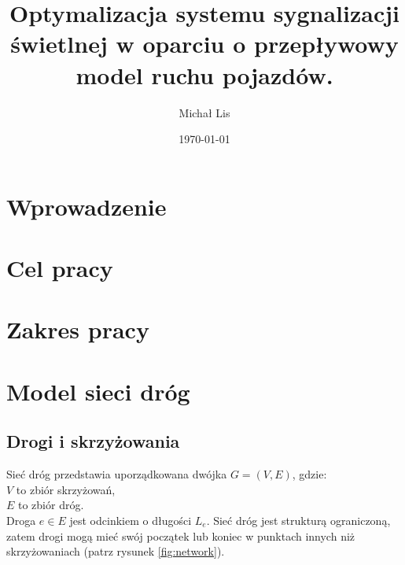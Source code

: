 \documentclass[12pt]{book}
\begin{document}
\title{Optymalizacja  systemu sygnalizacji świetlnej w 
oparciu o przepływowy model ruchu pojazdów.}
\author{Michał Lis}
\date{\today}
\maketitle
\chapter{Wprowadzenie}
\chapter{Cel pracy}
\chapter{Zakres pracy}
   
\chapter{Model sieci dróg}
\section{Drogi i skrzyżowania}
Sieć dróg przedstawia uporządkowana dwójka $G=(V,E)$, gdzie:\\ 
$V$ to zbiór skrzyżowań,\\
$E$ to zbiór dróg.\\
Droga $e \in E$ jest odcinkiem o długości $L_e$. Sieć dróg jest strukturą ograniczoną, zatem drogi mogą mieć swój początek lub koniec w punktach innych niż skrzyżowaniach (patrz rysunek \ref{fig:network}).

\end{document}
